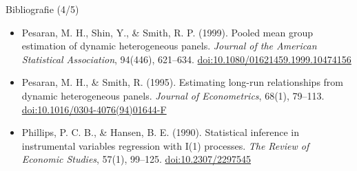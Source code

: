 \begin{frame}{Bibliografie (4/5)}
\begin{itemize}
    \item Pesaran, M. H., Shin, Y., \& Smith, R. P. (1999). Pooled mean group estimation of dynamic heterogeneous panels. \textit{Journal of the American Statistical Association}, 94(446), 621--634. \href{https://doi.org/10.1080/01621459.1999.10474156}{doi:10.1080/01621459.1999.10474156}
    \item Pesaran, M. H., \& Smith, R. (1995). Estimating long-run relationships from dynamic heterogeneous panels. \textit{Journal of Econometrics}, 68(1), 79--113. \href{https://doi.org/10.1016/0304-4076(94)01644-F}{doi:10.1016/0304-4076(94)01644-F}
    \item Phillips, P. C. B., \& Hansen, B. E. (1990). Statistical inference in instrumental variables regression with I(1) processes. \textit{The Review of Economic Studies}, 57(1), 99--125. \href{https://doi.org/10.2307/2297545}{doi:10.2307/2297545}
\end{itemize}
\end{frame}

